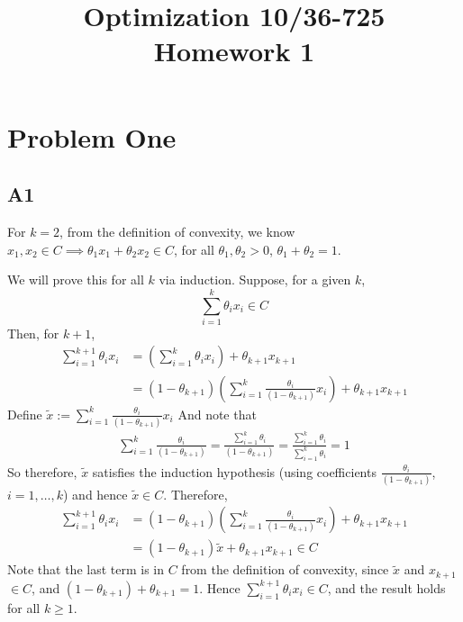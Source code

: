 \documentclass{article}
\title{Optimization 10/36-725\\
        Homework 1}
\author{}
\date{}
\begin{document}
\maketitle


\section{Problem One}

\subsection{A1}
For $k=2$, from the definition of convexity, we know $x_1,x_2 \in C \implies
\theta_1 x_1 + \theta_2 x_2 \in C$,  for all $\theta_1,\theta_2>0$,
$\theta_1+\theta_2 = 1$.

We will prove this for all $k$ via induction. Suppose, for a given $k$, 
\begin{equation}
    \sum_{i=1}^k \theta_i x_i  \in C
\end{equation}
Then, for $k+1$, 
\begin{align}
    \sum_{i=1}^{k+1} \theta_i x_i  &= \left( \sum_{i=1}^k \theta_i x_i
  \right) + \theta_{k+1}x_{k+1} \\ &= (1-\theta_{k+1}) \left( \sum_{i=1}^k
    \frac{\theta_i}{(1-\theta_{k+1})} x_i \right) + \theta_{k+1}x_{k+1}
\end{align}
Define $\tilde{x} := \sum_{i=1}^k \frac{\theta_i}{(1-\theta_{k+1})} x_i$ And
note that
\begin{align}
    \sum_{i=1}^k \frac{\theta_i}{(1-\theta_{k+1})} = \frac{\sum_{i=1}^k
    \theta_i}{(1-\theta_{k+1})} = \frac{\sum_{i=1}^k \theta_i}{\sum_{i=1}^k
    \theta_i} = 1
\end{align}
So therefore, $\tilde{x}$ satisfies the induction hypothesis (using coefficients
$\frac{\theta_i}{(1-\theta_{k+1})}$, $i=1,\ldots,k$) and hence $\tilde{x} \in C$. Therefore,
\begin{align}
    \sum_{i=1}^{k+1} \theta_i x_i &= (1-\theta_{k+1}) \left( \sum_{i=1}^k
    \frac{\theta_i}{(1-\theta_{k+1})} x_i \right) + \theta_{k+1}x_{k+1} \\ &=
    (1-\theta_{k+1}) \tilde{x} + \theta_{k+1}x_{k+1} \in C
\end{align}
Note that the last term is in $C$ from the definition of convexity, since $\tilde{x}$ and
$x_{k+1}$ $\in C$, and $(1-\theta_{k+1}) + \theta_{k+1} = 1$.  Hence
$\sum_{i=1}^{k+1} \theta_i x_i \in C$, and the result holds for all $k \geq 1$.
\end{document}

